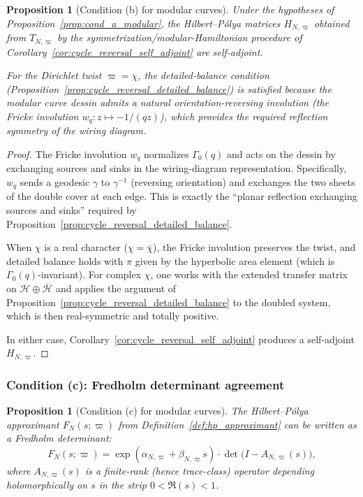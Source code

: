 \documentclass[11pt,oneside]{amsbook}
\numberwithin{equation}{section}
\theoremstyle{plain}
\newtheorem{proposition}[theorem]{Proposition}
\theoremstyle{definition}
\theoremstyle{remark}
\begin{document}
\begin{proposition}[Condition (b) for modular curves]
\label{prop:cond_b_modular}
Under the hypotheses of Proposition~\ref{prop:cond_a_modular}, the Hilbert--P\'olya matrices $H_{N,\varpi}$ obtained from $T_{N,\varpi}$ by the symmetrization/modular-Hamiltonian procedure of Corollary~\ref{cor:cycle_reversal_self_adjoint} are self-adjoint.

For the Dirichlet twist $\varpi=\chi$, the detailed-balance condition (Proposition~\ref{prop:cycle_reversal_detailed_balance}) is satisfied because the modular curve dessin admits a natural orientation-reversing involution (the Fricke involution $w_q:z\mapsto -1/(qz)$), which provides the required reflection symmetry of the wiring diagram.
\end{proposition}

\begin{proof}
The Fricke involution $w_q$ normalizes $\Gamma_0(q)$ and acts on the dessin by exchanging sources and sinks in the wiring-diagram representation.
Specifically, $w_q$ sends a geodesic $\gamma$ to $\gamma^{-1}$ (reversing orientation) and exchanges the two sheets of the double cover at each edge.
This is exactly the ``planar reflection exchanging sources and sinks'' required by Proposition~\ref{prop:cycle_reversal_detailed_balance}.

When $\chi$ is a real character ($\chi=\overline{\chi}$), the Fricke involution preserves the twist, and detailed balance holds with $\pi$ given by the hyperbolic area element (which is $\Gamma_0(q)$-invariant).
For complex $\chi$, one works with the extended transfer matrix on $\mathcal{H}\oplus\overline{\mathcal{H}}$ and applies the argument of Proposition~\ref{prop:cycle_reversal_detailed_balance} to the doubled system, which is then real-symmetric and totally positive.

In either case, Corollary~\ref{cor:cycle_reversal_self_adjoint} produces a self-adjoint $H_{N,\varpi}$.
\end{proof}

\subsubsection{Condition (c): Fredholm determinant agreement}

\begin{proposition}[Condition (c) for modular curves]
\label{prop:cond_c_modular}
The Hilbert--P\'olya approximant $F_N(s;\varpi)$ from Definition~\ref{def:hp_approximant} can be written as a Fredholm determinant:
\begin{equation}
\label{eq:cond_c_fredholm}
F_N(s;\varpi) = \exp(\alpha_{N,\varpi}+\beta_{N,\varpi}s)\cdot\det\!\bigl(I-A_{N,\varpi}(s)\bigr),
\end{equation}
where $A_{N,\varpi}(s)$ is a finite-rank (hence trace-class) operator depending holomorphically on $s$ in the strip $0<\Re(s)<1$.
\end{proposition}
\end{document}
